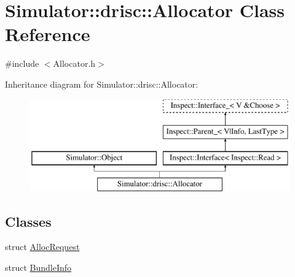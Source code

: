 \hypertarget{class_simulator_1_1drisc_1_1_allocator}{\section{Simulator\+:\+:drisc\+:\+:Allocator Class Reference}
\label{class_simulator_1_1drisc_1_1_allocator}
}


{\ttfamily \#include $<$Allocator.\+h$>$}

Inheritance diagram for Simulator\+:\+:drisc\+:\+:Allocator\+:\begin{figure}[H]
\begin{center}
\leavevmode
\includegraphics[height=4.000000cm]{class_simulator_1_1drisc_1_1_allocator}
\end{center}
\end{figure}
\subsection*{Classes}
\begin{DoxyCompactItemize}
\item 
struct \hyperlink{struct_simulator_1_1drisc_1_1_allocator_1_1_alloc_request}{Alloc\+Request}
\item 
struct \hyperlink{struct_simulator_1_1drisc_1_1_allocator_1_1_bundle_info}{Bundle\+Info}
\end{DoxyCompactItemize}
